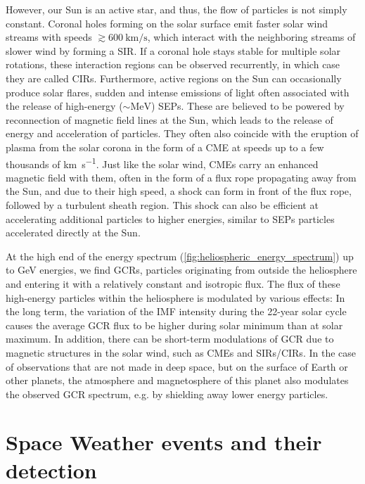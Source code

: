 However, our Sun is an active star, and thus, the flow of particles is not simply constant.
Coronal holes forming on the solar surface emit faster solar wind streams with speeds $\gtrsim \SI{600}{\kilo\meter\per\second}$, which interact with the neighboring streams of slower wind by forming a \ac{SIR}. If a coronal hole stays stable for multiple solar rotations, these interaction regions can be observed recurrently, in which case they are called \acp{CIR}.
Furthermore, active regions on the Sun can occasionally produce solar flares, sudden and intense emissions of light often associated with the release of high-energy ($\sim \si{\mega\electronvolt}$) \acp{SEP}.
These are believed to be powered by reconnection of magnetic field lines at the Sun, which leads to the release of energy and acceleration of particles.
They often also coincide with the eruption of plasma from the solar corona in the form of a \ac{CME} at speeds up to a few thousands of \si{\kilo\meter\per\second}.
Just like the solar wind, \acp{CME} carry an enhanced magnetic field with them, often in the form of a flux rope propagating away from the Sun, and due to their high speed, a shock can form in front of the flux rope, followed by a turbulent sheath region.
This shock can also be efficient at accelerating additional particles to higher energies, similar to \acp{SEP} particles accelerated directly at the Sun.

At the high end of the energy spectrum (\autoref{fig:heliospheric_energy_spectrum}) up to \si{\giga\electronvolt} energies, we find \acp{GCR}, particles originating from outside the heliosphere and entering it with a relatively constant and isotropic flux. 
The flux of these high-energy particles within the heliosphere is modulated by various effects: In the long term, the variation of the \ac{IMF} intensity during the 22-year solar cycle causes the average \ac{GCR} flux to be higher during solar minimum than at solar maximum. In addition, there can be short-term modulations of \ac{GCR} due to magnetic structures in the solar wind, such as \acp{CME} and \acp{SIR}/\acp{CIR}. In the case of observations that are not made in deep space, but on the surface of Earth or other planets, the atmosphere and magnetosphere of this planet also modulates the observed \ac{GCR} spectrum, e.g. by shielding away lower energy particles. 


\section{Space Weather events and their detection}

